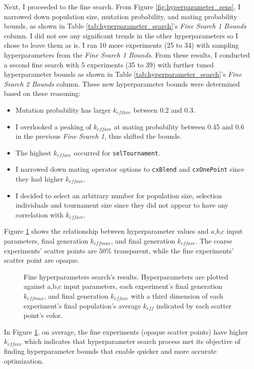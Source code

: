 Next, I proceeded to the fine search. 
From Figure \ref{fig:hyperparameter_sens}, I narrowed down population size, 
mutation probability, and mating probability bounds, as shown in Table 
\ref{tab:hyperparameter_search}'s \textit{Fine Search 1 Bounds} column. 
I did not see any significant trends in the other hyperparameters so I chose 
to leave them as is. 
I ran 10 more experiments (25 to 34) with sampling hyperparameters from 
the \textit{Fine Search 1 Bounds}. 
From these results, I conducted a second fine search with 5 experiments 
(35 to 39) with further tuned hyperparameter bounds as shown in Table 
\ref{tab:hyperparameter_search}'s \textit{Fine Search 2 Bounds} column. 
These new hyperparameter bounds were determined based on these reasoning: 
\begin{itemize}
    \item Mutation probability has larger $k_{eff ave}$ between 0.2 and 0.3.
    \item I overlooked a peaking of $k_{eff ave}$ at mating probability between 
    0.45 and 0.6 in the previous \textit{Fine Search 1}, thus shifted the bounds. 
    \item The highest $k_{eff ave}$ occurred for \texttt{selTournament}. 
    \item I narrowed down mating operator options to \texttt{cxBlend} and 
    \texttt{cxOnePoint} since they had higher $k_{eff ave}$. 
    \item I decided to select an arbitrary number for population size, 
    selection individuals and tournament size since they did not appear to have 
    any correlation with $k_{eff ave}$. 
\end{itemize}
Figure \ref{fig:input_hyperparameters_sens} shows the relationship between 
hyperparameter values and $a$,$b$,$c$ input parameters, final generation 
$k_{eff max}$, and final generation $k_{eff ave}$. 
The coarse experiments' scatter points are $50\%$ transparent, while the fine 
experiments' scatter point are opaque. 
\begin{figure}[]
    \centering
    \caption{Fine hyperparameters search's results. Hyperparameters are plotted 
    against a,b,c input parameters, each experiment's final generation
    $k_{eff max}$, and final generation $k_{eff ave}$ with a third dimension of 
    each experiment's final population's average $k_{eff}$ indicated by each 
    scatter point's color.}
    \label{fig:input_hyperparameters_sens}
\end{figure}
In Figure \ref{fig:input_hyperparameters_sens}, on average, the fine experiments 
(opaque scatter points) have higher $k_{eff ave}$ which indicates that 
hyperparameter search process met its objective of finding hyperparameter 
bounds that enable quicker and more accurate optimization. 

